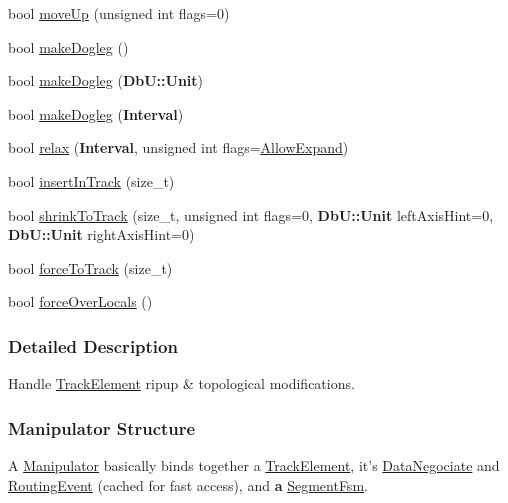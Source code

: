 \begin{DoxyCompactItemize}
\item 
bool \hyperlink{classKite_1_1Manipulator_ac954731e16188acb6984f348bf2d9d20}{move\-Up} (unsigned int flags=0)
\item 
bool \hyperlink{classKite_1_1Manipulator_af4d93a43ea18ae124da71072c66d1e0a}{make\-Dogleg} ()
\item 
bool \hyperlink{classKite_1_1Manipulator_a97e56b831481ef65309f6e3b7e3f4f3d}{make\-Dogleg} ({\bf Db\-U\-::\-Unit})
\item 
bool \hyperlink{classKite_1_1Manipulator_af7b3305693dab195d0c5d075821fbb30}{make\-Dogleg} ({\bf Interval})
\item 
bool \hyperlink{classKite_1_1Manipulator_a8b5b69fd5762d5a0cbc4ceea4d1b68c1}{relax} ({\bf Interval}, unsigned int flags=\hyperlink{classKite_1_1Manipulator_a2af2ad6b6441614038caf59d04b3b217a41880b9f6652400677e21c8681f97675}{Allow\-Expand})
\item 
bool \hyperlink{classKite_1_1Manipulator_a7140b507da2cab137d968a037bed19df}{insert\-In\-Track} (size\-\_\-t)
\item 
bool \hyperlink{classKite_1_1Manipulator_aba69c61ccb330e26aaa8211f0454795f}{shrink\-To\-Track} (size\-\_\-t, unsigned int flags=0, {\bf Db\-U\-::\-Unit} left\-Axis\-Hint=0, {\bf Db\-U\-::\-Unit} right\-Axis\-Hint=0)
\item 
bool \hyperlink{classKite_1_1Manipulator_a76d3956660cfa624696e2a5f2916cd22}{force\-To\-Track} (size\-\_\-t)
\item 
bool \hyperlink{classKite_1_1Manipulator_add26b688d75a99a1ae781787eead08d5}{force\-Over\-Locals} ()
\end{DoxyCompactItemize}


\subsubsection{Detailed Description}
Handle \hyperlink{classKite_1_1TrackElement}{Track\-Element} ripup \& topological modifications. 

\hypertarget{classKite_1_1Manipulator_secManipStruct}{}\subsubsection{Manipulator Structure}\label{classKite_1_1Manipulator_secManipStruct}
A \hyperlink{classKite_1_1Manipulator}{Manipulator} basically binds together a \hyperlink{classKite_1_1TrackElement}{Track\-Element}, it's \hyperlink{classKite_1_1DataNegociate}{Data\-Negociate} and \hyperlink{classKite_1_1RoutingEvent}{Routing\-Event} (cached for fast access), and {\bfseries a} \hyperlink{classKite_1_1SegmentFsm}{Segment\-Fsm}.

